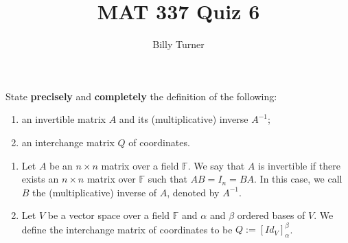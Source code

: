 \documentclass[12pt,answers]{exam}
\newcommand{\F}{\mathbb{F}}
\newenvironment{problem}[2][Problem]{\begin{trivlist}
\item[\hskip \labelsep {\bfseries #1}\hskip \labelsep {\bfseries #2.}]}{\end{trivlist}}
\begin{document}
\title{MAT 337 Quiz 6} 
\author{Billy Turner}
\maketitle
\thispagestyle{empty}

\begin{problem}{1}
State \textbf{precisely} and \textbf{completely} the definition of the following:
\begin{enumerate}[label=(\alph*)]
\item an invertible matrix $A$ and its (multiplicative) inverse $A^{-1}$;
\item an interchange matrix $Q$ of coordinates.
\end{enumerate}
\end{problem}

\begin{solution}
\begin{enumerate}[label=(\alph*)]
\item Let $A$ be an $n\times n$ matrix over a field $\F$. We say that $A$ is invertible if there exists an $n\times n$ matrix over $\F$ such that $AB=I_{n}=BA$. In this case, we call $B$ the (multiplicative) inverse of $A$, denoted by $A^{-1}$.
\item Let $V$ be a vector space over a field $\F$ and $\alpha$ and $\beta$ ordered bases of $V$. We define the interchange matrix of coordinates to be $Q:=[Id_{V}]^{\beta}_{\alpha}$.
\end{enumerate}
\end{solution}
\end{document}
